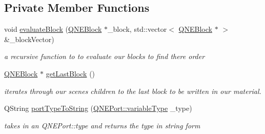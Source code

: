 \subsection*{Private Member Functions}
\begin{DoxyCompactItemize}
\item 
void \hyperlink{class_o_s_l_nodes_editor_a2847eb45d0080e03b5accca596ea43d8}{evaluate\-Block} (\hyperlink{class_q_n_e_block}{Q\-N\-E\-Block} $\ast$\-\_\-block, std\-::vector$<$ \hyperlink{class_q_n_e_block}{Q\-N\-E\-Block} $\ast$ $>$ \&\-\_\-block\-Vector)
\begin{DoxyCompactList}\small\item\em a recursive function to to evaluate our blocks to find there order \end{DoxyCompactList}\item 
\hyperlink{class_q_n_e_block}{Q\-N\-E\-Block} $\ast$ \hyperlink{class_o_s_l_nodes_editor_ab662050f4cb531c1d1a7980ca0327e82}{get\-Last\-Block} ()
\begin{DoxyCompactList}\small\item\em iterates through our scenes children to the last block to be written in our material. \end{DoxyCompactList}\item 
\hypertarget{class_o_s_l_nodes_editor_ab5c850b082cd87c467b16d33596afa03}{Q\-String \hyperlink{class_o_s_l_nodes_editor_ab5c850b082cd87c467b16d33596afa03}{port\-Type\-To\-String} (\hyperlink{class_q_n_e_port_aeb3a8a2ac138252d1a0afc2c4f00438f}{Q\-N\-E\-Port\-::variable\-Type} \-\_\-type)}\label{class_o_s_l_nodes_editor_ab5c850b082cd87c467b16d33596afa03}

\begin{DoxyCompactList}\small\item\em takes in an Q\-N\-E\-Port\-::type and returns the type in string form \end{DoxyCompactList}\end{DoxyCompactItemize}

